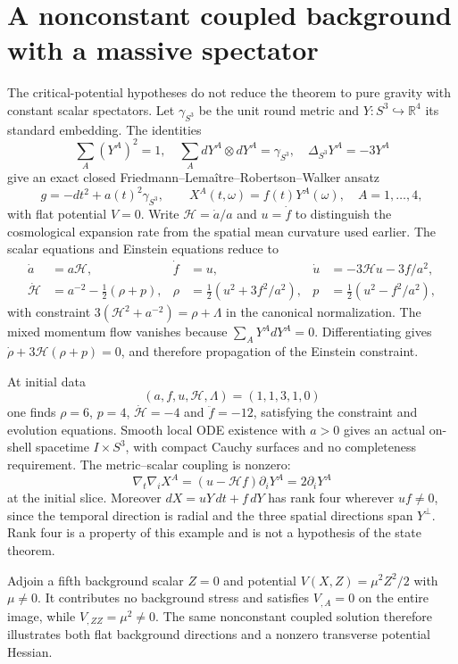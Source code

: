 \section{A nonconstant coupled background with a massive spectator}\label{sec:example}
The critical-potential hypotheses do not reduce the theorem to pure gravity with constant scalar spectators.
Let $\gamma_{S^3}$ be the unit round metric and $Y:S^3\hookrightarrow\mathbb R^4$ its standard embedding.
The identities
\[
\sum_A(Y^A)^2=1,\quad
\sum_A dY^A\otimes dY^A=\gamma_{S^3},\quad
\Delta_{S^3}Y^A=-3Y^A
\]
give an exact closed Friedmann--Lema\^itre--Robertson--Walker ansatz
\[
g=-dt^2+a(t)^2\gamma_{S^3},\qquad
X^A(t,\omega)=f(t)Y^A(\omega),\quad A=1,\ldots,4,
\]
with flat potential $V=0$.
Write $\mathscr H=\dot a/a$ and $u=\dot f$ to distinguish the cosmological expansion rate from the spatial mean curvature used earlier.
The scalar equations and Einstein equations reduce to
\begin{align*}
\dot a&=a\mathscr H,&\dot f&=u,&
\dot u&=-3\mathscr H u-3f/a^2,\\
\dot{\mathscr H}&=a^{-2}-\tfrac12(\rho+p),&
\rho&=\tfrac12(u^2+3f^2/a^2),&p&=\tfrac12(u^2-f^2/a^2),
\end{align*}
with constraint $3(\mathscr H^2+a^{-2})=\rho+\Lambda$ in the canonical normalization.
The mixed momentum flow vanishes because $\sum_A Y^AdY^A=0$.
Differentiating gives $\dot\rho+3\mathscr H(\rho+p)=0$, and therefore propagation of the Einstein constraint.

At initial data
\[
(a,f,u,\mathscr H,\Lambda)=(1,1,3,1,0)
\]
one finds $\rho=6$, $p=4$, $\dot{\mathscr H}=-4$ and $\ddot f=-12$, satisfying the constraint and evolution equations.
Smooth local ODE existence with $a>0$ gives an actual on-shell spacetime $I\times S^3$, with compact Cauchy surfaces and no completeness requirement.
The metric--scalar coupling is nonzero:
\[
\nabla_t\nabla_iX^A=(u-\mathscr H f)\partial_iY^A
=2\partial_iY^A
\]
at the initial slice.
Moreover $dX=uY\,dt+f\,dY$ has rank four wherever $uf\ne0$, since the temporal direction is radial and the three spatial directions span $Y^\perp$.
Rank four is a property of this example and is not a hypothesis of the state theorem.

Adjoin a fifth background scalar $Z=0$ and potential $V(X,Z)=\mu^2Z^2/2$ with $\mu\ne0$.
It contributes no background stress and satisfies $V_{,A}=0$ on the entire image, while $V_{,ZZ}=\mu^2\ne0$.
The same nonconstant coupled solution therefore illustrates both flat background directions and a nonzero transverse potential Hessian.
